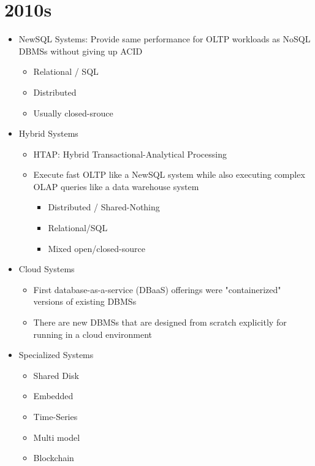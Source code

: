 \documentclass[11pt]{article}
\begin{document}
\section{2010s}
\begin{itemize}
    \item NewSQL Systems: Provide same performance for OLTP workloads as NoSQL DBMSs without giving up ACID
    \begin{itemize}
        \item Relational / SQL
        \item Distributed
        \item Usually closed-srouce
    \end{itemize}
    \item Hybrid Systems
    \begin{itemize}
        \item HTAP: Hybrid Transactional-Analytical Processing
        \item Execute fast OLTP like a NewSQL system while also executing complex OLAP queries like a data warehouse system
        \begin{itemize}
            \item Distributed / Shared-Nothing
            \item Relational/SQL
            \item Mixed open/closed-source
        \end{itemize}
    \end{itemize}
    \item Cloud Systems
    \begin{itemize}
        \item First database-as-a-service (DBaaS) offerings were "containerized" versions of existing DBMSs
        \item There are new DBMSs that are designed from scratch explicitly for running in a cloud environment
    \end{itemize}
    \item Specialized Systems
    \begin{itemize}
        \item Shared Disk
        \item Embedded
        \item Time-Series
        \item Multi model
        \item Blockchain
    \end{itemize}
\end{itemize}
\end{document}
